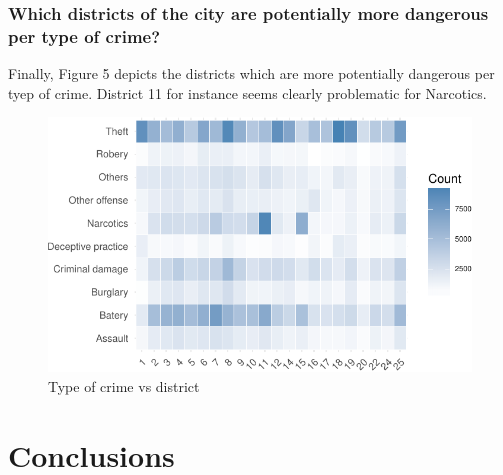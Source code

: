 \documentclass[]{article}
\begin{document}
\subsubsection{Which districts of the city are potentially more
dangerous per type of
crime?}\label{which-districts-of-the-city-are-potentially-more-dangerous-per-type-of-crime}

Finally, Figure 5 depicts the districts which are more potentially
dangerous per tyep of crime. District 11 for instance seems clearly
problematic for Narcotics.

\begin{figure}[H]

{\centering \includegraphics{Assessment_1v11_files/figure-latex/fig10-1} 

}

\caption{Type of crime vs district}\label{fig:fig10}
\end{figure}

\section{Conclusions}\label{conclusions}
\end{document}
